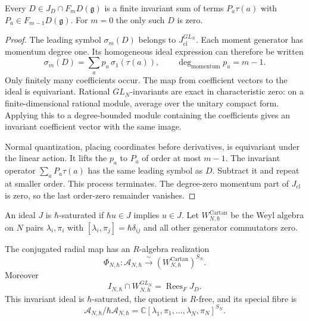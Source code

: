 \begin{lemma}\label{lem:vol2-strict-moment-orders}
Every $D\in J_D\cap F_mD(\mathfrak g)$ is a finite invariant
sum of terms $P_a\tau(a)$ with
$P_a\in F_{m-1}D(\mathfrak g)$.
For $m=0$ the only such $D$ is zero.
\end{lemma}

\begin{proof}
The leading symbol $\sigma_m(D)$ belongs to
$J_{\mathrm{cl}}^{GL_N}$.
Each moment generator has momentum degree one.
Its homogeneous ideal expression can therefore be written
\[
 \sigma_m(D)=\sum_a p_a\,\sigma_1(\tau(a)),
 \qquad \deg_{\mathrm{momentum}}p_a=m-1.
\]
Only finitely many coefficients occur.
The map from coefficient vectors to the ideal is equivariant.
Rational $GL_N$-invariants are exact in characteristic zero:
on a finite-dimensional rational module, average over the
unitary compact form. Applying this to a degree-bounded
module containing the coefficients gives an invariant
coefficient vector with the same image.

Normal quantization, placing coordinates before derivatives,
is equivariant under the linear action. It lifts the $p_a$
to $P_a$ of order at most $m-1$.
The invariant operator $\sum_aP_a\tau(a)$ has the same
leading symbol as $D$. Subtract it and repeat at smaller
order. This process terminates.
The degree-zero momentum part of $J_{\mathrm{cl}}$ is zero,
so the last order-zero remainder vanishes.
\end{proof}

An ideal $J$ is $\hbar$-saturated if $\hbar u\in J$
implies $u\in J$. Let $W^{\mathrm{Cartan}}_{N,\hbar}$
be the Weyl algebra on $N$ pairs $\lambda_i,\pi_i$ with
$[\lambda_i,\pi_j]=\hbar\delta_{ij}$ and all other
generator commutators zero.

\begin{theorem}\label{thm:vol2-integral-harish-chandra}
The conjugated radial map has an $R$-algebra realization
\[
 \Phi_{N,\hbar}:\mathcal A_{N,\hbar}
   \xrightarrow{\ \sim\ }
   (W^{\mathrm{Cartan}}_{N,\hbar})^{S_N}.
\]
Moreover
\[
 I_{N,\hbar}\cap W_{N,\hbar}^{GL_N}
     =\operatorname{Rees}_FJ_D.
\]
This invariant ideal is $\hbar$-saturated, the quotient
is $R$-free, and its special fibre is
\[
 \mathcal A_{N,\hbar}/\hbar\mathcal A_{N,\hbar}
   =\mathbb C[\lambda_1,\pi_1,\ldots,\lambda_N,\pi_N]^{S_N}.
\]
\end{theorem}

